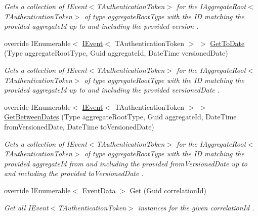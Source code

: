 \begin{DoxyCompactItemize}
\begin{DoxyCompactList}\small\item\em Gets a collection of I\+Event$<$\+T\+Authentication\+Token$>$ for the I\+Aggregate\+Root$<$\+T\+Authentication\+Token$>$ of type {\itshape aggregate\+Root\+Type}  with the ID matching the provided {\itshape aggregate\+Id}  up to and including the provided {\itshape version} . \end{DoxyCompactList}\item 
override I\+Enumerable$<$ \hyperlink{interfaceCqrs_1_1Events_1_1IEvent}{I\+Event}$<$ T\+Authentication\+Token $>$ $>$ \hyperlink{classCqrs_1_1Events_1_1MemoryCacheEventStore_a2913ce1088ce65a88046763a8f1a46d9_a2913ce1088ce65a88046763a8f1a46d9}{Get\+To\+Date} (Type aggregate\+Root\+Type, Guid aggregate\+Id, Date\+Time versioned\+Date)
\begin{DoxyCompactList}\small\item\em Gets a collection of I\+Event$<$\+T\+Authentication\+Token$>$ for the I\+Aggregate\+Root$<$\+T\+Authentication\+Token$>$ of type {\itshape aggregate\+Root\+Type}  with the ID matching the provided {\itshape aggregate\+Id}  up to and including the provided {\itshape versioned\+Date} . \end{DoxyCompactList}\item 
override I\+Enumerable$<$ \hyperlink{interfaceCqrs_1_1Events_1_1IEvent}{I\+Event}$<$ T\+Authentication\+Token $>$ $>$ \hyperlink{classCqrs_1_1Events_1_1MemoryCacheEventStore_ac57321649252167214d1661a578c6421_ac57321649252167214d1661a578c6421}{Get\+Between\+Dates} (Type aggregate\+Root\+Type, Guid aggregate\+Id, Date\+Time from\+Versioned\+Date, Date\+Time to\+Versioned\+Date)
\begin{DoxyCompactList}\small\item\em Gets a collection of I\+Event$<$\+T\+Authentication\+Token$>$ for the I\+Aggregate\+Root$<$\+T\+Authentication\+Token$>$ of type {\itshape aggregate\+Root\+Type}  with the ID matching the provided {\itshape aggregate\+Id}  from and including the provided {\itshape from\+Versioned\+Date}  up to and including the provided {\itshape to\+Versioned\+Date} . \end{DoxyCompactList}\item 
override I\+Enumerable$<$ \hyperlink{classCqrs_1_1Events_1_1EventData}{Event\+Data} $>$ \hyperlink{classCqrs_1_1Events_1_1MemoryCacheEventStore_a2a93a3f10423f608527fbc41a7ce8cef_a2a93a3f10423f608527fbc41a7ce8cef}{Get} (Guid correlation\+Id)
\begin{DoxyCompactList}\small\item\em Get all I\+Event$<$\+T\+Authentication\+Token$>$ instances for the given {\itshape correlation\+Id} . \end{DoxyCompactList}\end{DoxyCompactItemize}
